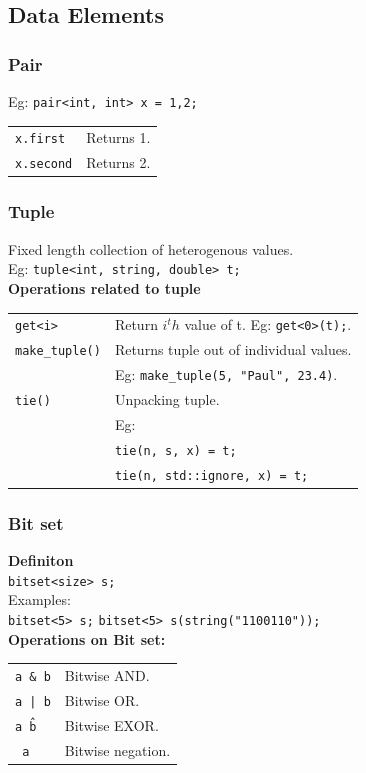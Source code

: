 \subsection{Data Elements}

\subsubsection{Pair}
Eg: \texttt{pair<int, int> x = {1,2};}\\
\begin{tabularx}{\linewidth}{lX}
\texttt{x.first} & Returns 1. \\
\texttt{x.second} & Returns 2.
\end{tabularx}

\subsubsection{Tuple}
Fixed length collection of heterogenous values.\\
Eg: \texttt{tuple<int, string, double> t;}\\

\textbf{Operations related to tuple}\\
\begin{tabularx}{\linewidth}{lX}
\texttt{get<i>} & Return $i^th$ value of t. Eg: \texttt{get<0>(t);}.\\
\texttt{make\_tuple()} & Returns tuple out of individual values.\\
& Eg: \texttt{make\_tuple(5, "Paul", 23.4)}.\\
\texttt{tie()} & Unpacking tuple.\\
& Eg: \\
& \texttt{tie(n, s, x) = t;}\\
& \texttt{tie(n, std::ignore, x) = t;}\\
\end{tabularx}

\subsubsection{Bit set}

\textbf{Definiton}\\
\texttt{bitset<size> s;}\\
Examples:\\
\texttt{bitset<5> s;}
\texttt{bitset<5> s(string("1100110"));}\\
\textbf{Operations on Bit set:}\\
\begin{tabularx}{\linewidth}{lX}
\texttt{a \& b} & Bitwise AND.\\
\texttt{a | b} & Bitwise OR.\\
\texttt{a \^ b} & Bitwise EXOR.\\
\texttt{~a} & Bitwise negation.\\
\end{tabularx}
